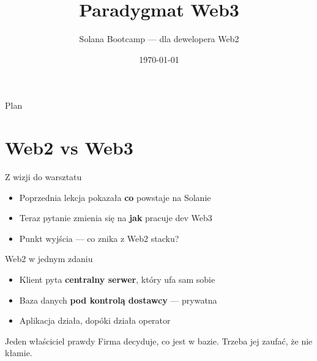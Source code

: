 

\usepackage[utf8]{inputenc}
\usepackage[T1]{fontenc}
\usetikzlibrary{positioning, arrows.meta}

\title{Paradygmat Web3}
\subtitle{Solana Bootcamp --- dla dewelopera Web2}
\author{}
\date{\today}



\maketitleframe

\begin{frame}{Plan}
  \tableofcontents
\end{frame}

\section{Web2 vs Web3}

\begin{frame}{Z wizji do warsztatu}
  \begin{itemize}
    \item Poprzednia lekcja pokazała \textbf{co} powstaje na Solanie
    \item Teraz pytanie zmienia się na \textbf{jak} pracuje dev Web3
    \item Punkt wyjścia --- co znika z Web2 stacku?
  \end{itemize}
\end{frame}

\begin{frame}{Web2 w jednym zdaniu}
  \begin{itemize}
    \item Klient pyta \textbf{centralny serwer}, który ufa sam sobie
    \item Baza danych \textbf{pod kontrolą dostawcy} --- prywatna
    \item Aplikacja działa, dopóki działa operator
  \end{itemize}
  \vspace{0.3cm}
  \begin{alertblock}{Jeden właściciel prawdy}
    Firma decyduje, co jest w bazie. Trzeba jej zaufać, że nie kłamie.
  \end{alertblock}
\end{frame}

